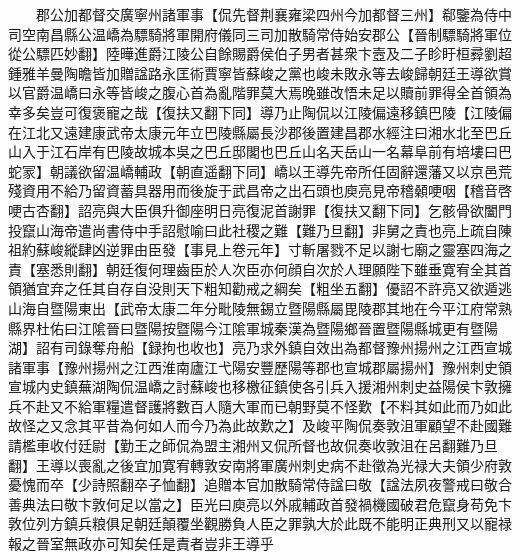　　郡公加都督交廣寧州諸軍事【侃先督荆襄雍梁四州今加都督三州】郗鑒為侍中司空南昌縣公温嶠為驃騎將軍開府儀同三司加散騎常侍始安郡公【晉制驃騎將軍位從公驃匹妙翻】陸曄進爵江陵公自餘賜爵侯伯子男者甚衆卞壼及二子眕盱桓彛劉超鍾雅羊曼陶瞻皆加贈諡路永匡術賈寧皆蘇峻之黨也峻未敗永等去峻歸朝廷王導欲賞以官爵温嶠曰永等皆峻之腹心首為亂階罪莫大焉晚雖改悟未足以贖前罪得全首領為幸多矣豈可復褒寵之哉【復扶又翻下同】導乃止陶侃以江陵偏遠移鎮巴陵【江陵偏在江北又遠建康武帝太康元年立巴陵縣屬長沙郡後置建昌郡水經注曰湘水北至巴丘山入于江石岸有巴陵故城本吳之巴丘邸閣也巴丘山名天岳山一名幕阜前有培塿曰巴蛇冡】朝議欲留温嶠輔政【朝直遥翻下同】嶠以王導先帝所任固辭還藩又以京邑荒殘資用不給乃留資蓄具器用而後旋于武昌帝之出石頭也庾亮見帝稽顙哽咽【稽音啓哽古杏翻】詔亮與大臣俱升御座明日亮復泥首謝罪【復扶又翻下同】乞骸骨欲闔門投竄山海帝遣尚書侍中手詔慰喻曰此社稷之難【難乃旦翻】非舅之責也亮上疏自陳祖約蘇峻縱肆凶逆罪由臣發【事見上卷元年】寸斬屠戮不足以謝七廟之靈塞四海之責【塞悉則翻】朝廷復何理齒臣於人次臣亦何顔自次於人理願陛下雖垂寛宥全其首領猶宜弃之任其自存自没則天下粗知勸戒之綱矣【粗坐五翻】優詔不許亮又欲遁逃山海自暨陽東出【武帝太康二年分毗陵無錫立暨陽縣屬毘陵郡其地在今平江府常熟縣界杜佑曰江隂晉曰暨陽按暨陽今江隂軍城秦漢為暨陽鄉晉置暨陽縣城更有暨陽湖】詔有司錄奪舟船【録拘也收也】亮乃求外鎮自效出為都督豫州揚州之江西宣城諸軍事【豫州揚州之江西淮南廬江弋陽安豐歷陽等郡也宣城郡屬揚州】豫州刺史領宣城内史鎮蕪湖陶侃温嶠之討蘇峻也移檄征鎮使各引兵入援湘州刺史益陽侯卞敦擁兵不赴又不給軍糧遣督護將數百人隨大軍而已朝野莫不怪歎【不料其如此而乃如此故怪之又念其平昔為何如人而今乃為此故歎之】及峻平陶侃奏敦沮軍顧望不赴國難請檻車收付廷尉【勤王之師侃為盟主湘州又侃所督也故侃奏收敦沮在呂翻難乃旦翻】王導以喪亂之後宜加寛宥轉敦安南將軍廣州刺史病不赴徵為光禄大夫領少府敦憂愧而卒【少詩照翻卒子恤翻】追贈本官加散騎常侍諡曰敬【諡法夙夜警戒曰敬合善典法曰敬卞敦何足以當之】臣光曰庾亮以外戚輔政首發禍機國破君危竄身苟免卞敦位列方鎮兵粮俱足朝廷顛覆坐觀勝負人臣之罪孰大於此既不能明正典刑又以寵禄報之晉室無政亦可知矣任是責者豈非王導乎


